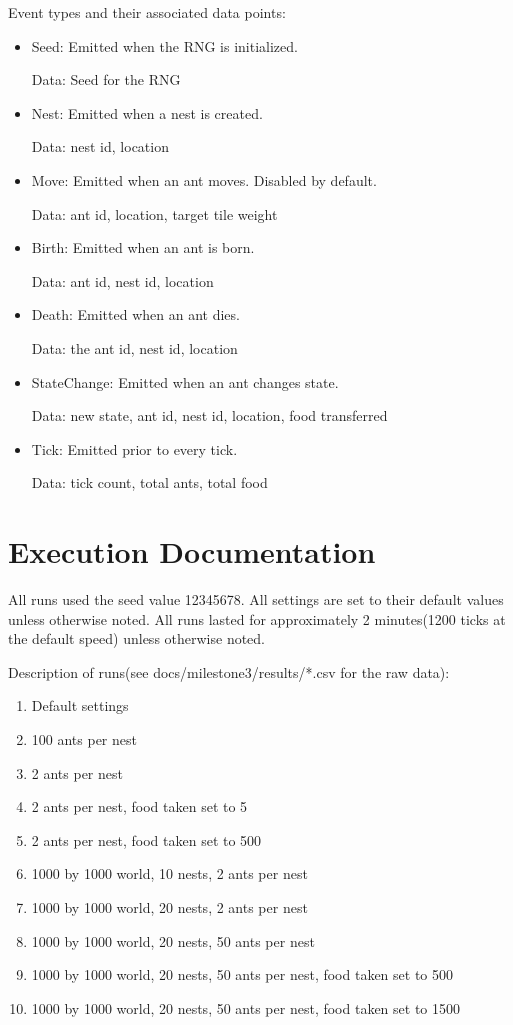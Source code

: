 \documentclass{article}
\begin{document}
Event types and their associated data points:
\begin{itemize}
    \item Seed: Emitted when the RNG is initialized.

    Data: Seed for the RNG
    \item Nest: Emitted when a nest is created.

    Data: nest id, location
    \item Move: Emitted when an ant moves.  Disabled by default.

    Data: ant id, location, target tile weight
    \item Birth: Emitted when an ant is born.

    Data: ant id, nest id, location
    \item Death: Emitted when an ant dies.

    Data: the ant id, nest id, location
    \item StateChange: Emitted when an ant changes state.

    Data: new state, ant id, nest id, location, food transferred
    \item Tick: Emitted prior to every tick.

    Data: tick count, total ants, total food
\end{itemize}

\section{Execution Documentation}

All runs used the seed value 12345678.
All settings are set to their default values unless otherwise noted.
All runs lasted for approximately 2 minutes(1200 ticks at the default speed) unless otherwise noted.

Description of runs(see docs/milestone3/results/*.csv for the raw data):
\begin{enumerate}
    \item Default settings
    \item 100 ants per nest
    \item 2 ants per nest
    \item 2 ants per nest, food taken set to 5
    \item 2 ants per nest, food taken set to 500
    \item 1000 by 1000 world, 10 nests, 2 ants per nest
    \item 1000 by 1000 world, 20 nests, 2 ants per nest
    \item 1000 by 1000 world, 20 nests, 50 ants per nest
    \item 1000 by 1000 world, 20 nests, 50 ants per nest, food taken set to 500
    \item 1000 by 1000 world, 20 nests, 50 ants per nest, food taken set to 1500
\end{enumerate}
\end{document}
